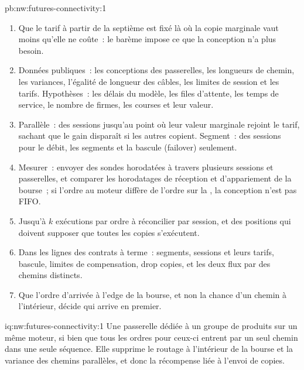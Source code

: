 \begin{solution}{pb:nw:futures-connectivity:1}
\begin{enumerate}[resume]
  seule session à 59.7~\% avec douze, alors que sous une passerelle de segment elle reste à 9.8~\%~; pour 20\,000 courses par mois et 0.50~euro la course, les
  onze sessions supplémentaires valent 4\,973~euros par mois, soit 452~euros par session en moyenne, mais chaque session au-delà de la sixième vaut moins
  que les 520~euros qu'elle coûte, et la douzième seulement 180.5~euros.
\item Que le tarif à partir de la septième est fixé là où la copie marginale vaut moins qu'elle ne coûte~: le barème impose ce que la
  conception n'a plus besoin.
\item Données publiques~: les conceptions des passerelles, les longueurs de chemin, les variances, l'égalité de longueur des câbles, les limites de session et les tarifs. Hypothèses~: les délais du modèle,
  les files d'attente, les temps de service, le nombre de firmes, les courses et leur valeur.
\item Parallèle~: des sessions jusqu'au point où leur valeur marginale rejoint le tarif, sachant que le gain disparaît si les autres copient. Segment~: des sessions
  pour le débit, les segments et la bascule (failover) seulement.
\item Mesurer~: envoyer des sondes horodatées à travers plusieurs sessions et passerelles, et comparer les horodatages de réception et d'appariement de la
  bourse~; si l'ordre au moteur diffère de l'ordre sur la , la conception n'est pas FIFO.
\item Jusqu'à $k$ exécutions par ordre à réconcilier par session, et des positions qui doivent supposer que toutes les copies s'exécutent.
\item Dans les lignes des contrats à terme~: segments, sessions et leurs tarifs, bascule, limites de compensation, drop copies, et les deux flux par des chemins distincts.
\item Que l'ordre d'arrivée à l'edge de la bourse, et non la chance d'un chemin à l'intérieur, décide qui arrive en premier.
\end{enumerate}
\end{solution}

\begin{solution}{iq:nw:futures-connectivity:1}
Une passerelle dédiée à un groupe de produits sur un même moteur, si bien que tous les ordres pour ceux-ci entrent par un seul chemin dans une seule séquence. Elle
supprime le routage à l'intérieur de la bourse et la variance des chemins parallèles, et donc la récompense liée à l'envoi de copies.
\end{solution}

